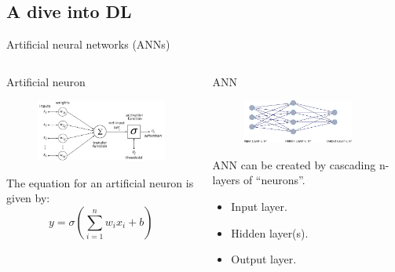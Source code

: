 \documentclass[10pt,aspectratio=169,dvipsnames]{beamer} %
\begin{document}
	\subsection{A dive into DL}
	\begin{frame}{Artificial neural networks (ANNs)}
		\begin{columns}[T]
			\begin{column}{.45\textwidth}
				\begin{block}{Artificial neuron}
					\begin{figure}
						\centering
						\includegraphics[width=.95\textwidth]{ArtificialNeuronModel.png}
					\end{figure}
				The equation for an artificial neuron is given by:
				\[
				y = \sigma\left(\sum_{i=1}^{n} w_i x_i + b\right)
				\]
				\end{block}
			\end{column}
			\begin{column}{0.55\textwidth}
				\begin{block}{ANN}
					\begin{figure}
						\centering
						\includegraphics[width=0.85\textwidth]{ANN.png}
					\end{figure}
					ANN can be created by cascading n-layers of “neurons”. 
					\begin{itemize}
						\item	Input layer.
						\item	Hidden layer(s).
						\item	Output layer.	
					\end{itemize}
				\end{block}
			\end{column}
		\end{columns}
	\end{frame}
\end{document}
